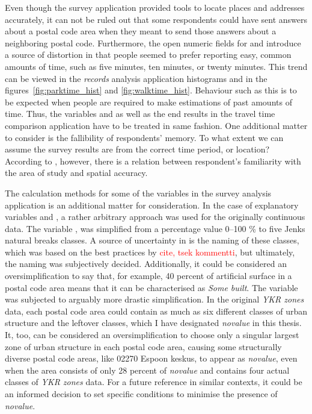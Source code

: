 Even though the survey application provided tools to locate places and addresses accurately, it can not be ruled out that some respondents could have sent answers about a postal code area when they meant to send those answers about a neighboring postal code. Furthermore, the open numeric fields for  and  introduce a source of distortion in that people seemed to prefer reporting easy, common amounts of time, such as five minutes, ten minutes, or twenty minutes. This trend can be viewed in the \textit{records} analysis application histograms and in the figures~\ref{fig:parktime_hist} and \ref{fig:walktime_hist}. Behaviour such as this is to be expected when people are required to make estimations of past amounts of time. Thus, the variables  and  as well as the end results in the travel time comparison application have to be treated in same fashion. One additional matter to consider is the fallibility of respondents' memory. To what extent we can assume the survey results are from the correct time period, or location? According to , however, there is a relation between respondent's familiarity with the area of study and spatial accuracy. 

The calculation methods for some of the variables in the survey analysis application is an additional matter for consideration. In the case of explanatory variables  and , a rather arbitrary approach was used for the originally continuous data. The variable , was simplified from a percentage value 0--100 \% to five Jenks natural breaks classes. A source of uncertainty in  is the naming of these classes, which was based on the best practices by \textcolor{red}{cite, tsek kommentti}, but ultimately, the naming was subjectively decided. Additionally, it could be considered an oversimplification to say that, for example, 40 percent of artificial surface in a postal code area means that it can be characterised as \textit{Some built}. The variable  was subjected to arguably more drastic simplification. In the original \textit{YKR zones} data, each postal code area could contain as much as six different classes of urban structure and the leftover classes, which I have designated \textit{novalue} in this thesis. It, too, can be considered an oversimplification to choose only a singular largest zone of urban structure in each postal code area, causing some structurally diverse postal code areas, like 02270 Espoon keskus, to appear as \textit{novalue}, even when the area consists of only 28 percent of \textit{novalue} and contains four actual classes of \textit{YKR zones} data. For a future reference in similar contexts, it could be an informed decision to set specific conditions to minimise the presence of \textit{novalue}.

